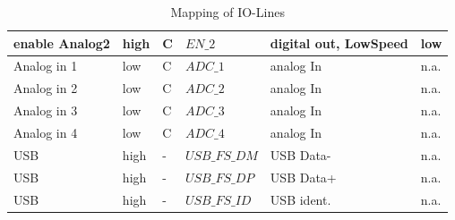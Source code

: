 \begin{table}[H]
\begin{tabular}{|l|l|l|l|l|l|}
					enable Analog2	& high 	& C		& $EN\_2$	& digital out, LowSpeed		& low		\\ \hline
					Analog in 1		& low 	& C		& $ADC\_1$	& analog In		& n.a.		\\ \hline
					Analog in 2		& low 	& C		& $ADC\_2$	& analog In		& n.a.		\\ \hline
					Analog in 3		& low 	& C		& $ADC\_3$	& analog In		& n.a.		\\ \hline
					Analog in 4		& low 	& C		& $ADC\_4$	& analog In		& n.a.		\\ \hline
					USB				& high 	& -		& $USB\_FS\_DM$	& USB Data-		& n.a.		\\ \hline
					USB				& high 	& -		& $USB\_FS\_DP$	& USB Data+		& n.a.		\\ \hline
					USB				& high 	& -		& $USB\_FS\_ID$	& USB ident.	& n.a.		\\ \hline
					\end{tabular}
					\caption{ Mapping of IO-Lines}
					\label{tab:Mapping}
		\end{table}

